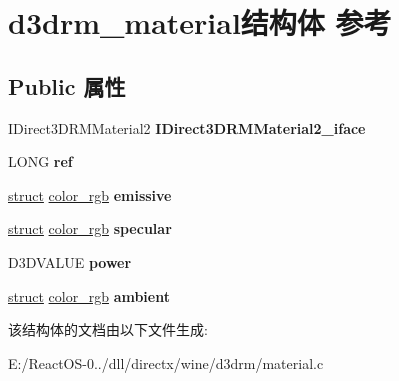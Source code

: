 \hypertarget{structd3drm__material}{}\section{d3drm\+\_\+material结构体 参考}
\label{structd3drm__material}
\subsection*{Public 属性}
\begin{DoxyCompactItemize}
\item 
\mbox{\label{structd3drm__material_afec3e6702ebd93f2838ba20198c587be}} 
I\+Direct3\+D\+R\+M\+Material2 {\bfseries I\+Direct3\+D\+R\+M\+Material2\+\_\+iface}
\item 
\mbox{\label{structd3drm__material_a0b116d5618c181a687d2864cd80d72b8}} 
L\+O\+NG {\bfseries ref}
\item 
\mbox{\label{structd3drm__material_a6b77f905d2519a48af88ab077f2d4a6d}} 
\hyperlink{interfacestruct}{struct} \hyperlink{structcolor__rgb}{color\+\_\+rgb} {\bfseries emissive}
\item 
\mbox{\label{structd3drm__material_a4e21028d7187a8b86ab4a6c4e1a04438}} 
\hyperlink{interfacestruct}{struct} \hyperlink{structcolor__rgb}{color\+\_\+rgb} {\bfseries specular}
\item 
\mbox{\label{structd3drm__material_aabd5d662fc19fec952c685b3759971fe}} 
D3\+D\+V\+A\+L\+UE {\bfseries power}
\item 
\mbox{\label{structd3drm__material_a8b1b573c3652b9bbfb07fc639e053b81}} 
\hyperlink{interfacestruct}{struct} \hyperlink{structcolor__rgb}{color\+\_\+rgb} {\bfseries ambient}
\end{DoxyCompactItemize}


该结构体的文档由以下文件生成\+:\begin{DoxyCompactItemize}
\item 
E\+:/\+React\+O\+S-\/0../dll/directx/wine/d3drm/material.\+c\end{DoxyCompactItemize}
